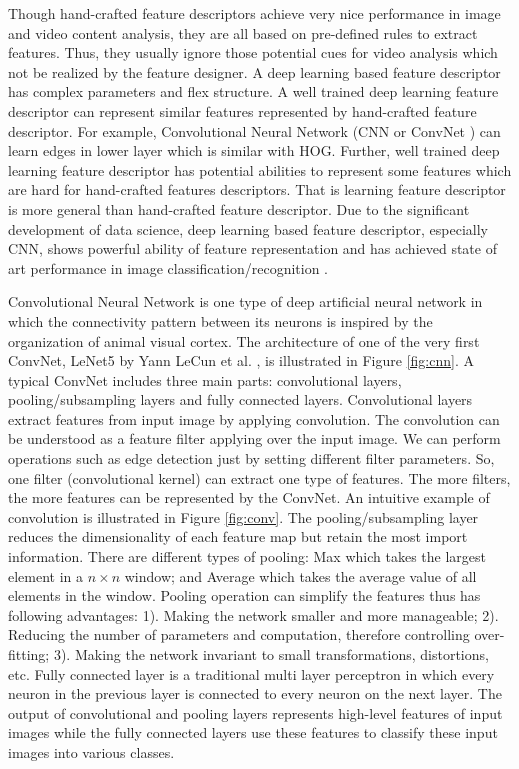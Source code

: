 Though hand-crafted feature descriptors achieve very nice performance in image and video content analysis, they are all based on pre-defined rules to extract features. Thus, they usually ignore those potential cues for video analysis which not be realized by the feature designer. A deep learning based feature descriptor has complex parameters and flex structure. A well trained deep learning feature descriptor can represent similar features represented by hand-crafted feature descriptor. For example, Convolutional Neural Network (CNN or ConvNet \cite{cnn}) can learn edges in lower layer which is similar with HOG. Further, well trained deep learning feature descriptor has potential abilities to represent some features which are hard for hand-crafted features descriptors. That is learning feature descriptor is more general than hand-crafted feature descriptor.  Due to the significant development of data science, deep learning based feature descriptor, especially CNN,  shows powerful ability of feature representation and has achieved state of art performance in image classification/recognition \cite{kaiming}.
\par 
Convolutional Neural Network is one type of deep artificial neural network in which the connectivity pattern between its neurons is inspired by the organization of animal visual cortex. The architecture of one of the very first ConvNet, LeNet5 by Yann LeCun et al. \cite{cnn}, is illustrated in Figure \ref{fig:cnn}. A typical ConvNet includes three main parts: convolutional layers, pooling/subsampling layers and fully connected layers. Convolutional layers extract features from input image by applying convolution. The convolution can be understood as a feature filter applying over the input image. We can perform operations such as edge detection just by setting different filter parameters. So, one filter (convolutional kernel) can extract one type of features. The more filters, the more features can be represented by the ConvNet. An intuitive example of convolution is illustrated in Figure \ref{fig:conv}. The pooling/subsampling layer reduces the dimensionality of each feature map but retain the most import information. There are different types of pooling: Max which takes the largest element in a \(n \times n\) window; and Average which takes the average value of all elements in the window. Pooling operation can simplify the features thus has following advantages: 1). Making the network smaller and more manageable; 2). Reducing the number of parameters and computation, therefore controlling over-fitting; 3). Making the network invariant to small transformations, distortions, etc. Fully connected layer is a traditional multi layer perceptron in which every neuron in the previous layer is connected to every neuron on the next layer. The output of convolutional and pooling layers represents high-level features of input images while the fully connected layers use these features to classify these input images into various classes.  

